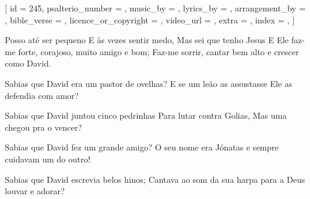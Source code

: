
[
    id                     = {245},
    psalterio_number       = {},
    music_by               = {},
    lyrics_by              = {},
    arrangement_by         = {},
    bible_verse            = {},
    licence_or_copyright   = {},
    video_url              = {},
    extra                  = {},
    index                  = {},
]


\beginchorus

Posso até ser pequeno
E às vezes sentir medo,
Mas sei que tenho Jesus
E Ele faz-me forte, corajoso, 
muito amigo e bom; 
Faz-me sorrir, 
cantar bem alto e crescer como David.

\endchorus


\beginverse

Sabias que David era um pastor de ovelhas? 
E se um leão as assustasse
Ele as defendia com amor?

\endverse


\beginverse

Sabias que David juntou cinco pedrinhas 
Para lutar contra Golias,
Mas uma chegou pra o vencer?

\endverse


\beginverse

Sabias que David fez um grande amigo? 
O seu nome era Jónatas
e sempre cuidavam um do outro!

\endverse



\beginverse

Sabias que David escrevia belos hinos; 
Cantava ao som da sua harpa
para a Deus louvar e adorar?

\endverse


\endsong
